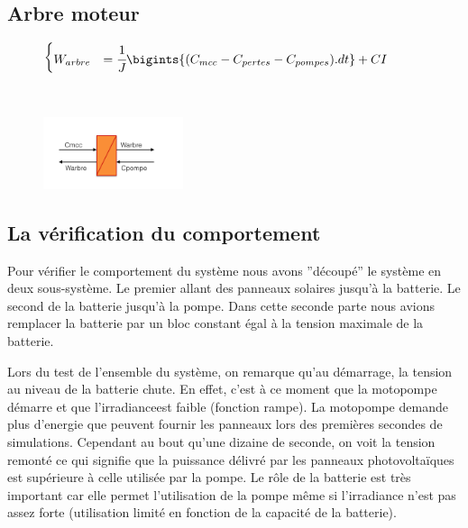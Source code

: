\subsection{Arbre moteur}
\vspace{-10px}
\begin{figure}[ht]
\centering
\begin{minipage}{.5\textwidth}  
\centering
$\begin{cases}
	 W_{arbre} &= \cfrac{1}{J}\bigints{(C_{mcc}-C_{pertes}-C_{pompes}).dt}+CI
\end{cases}$
\end{minipage}~
\begin{minipage}{.5\textwidth}
  \centering
\includegraphics[height=80px]{images/arbre.png}
\end{minipage}
\end{figure}
\FloatBarrier
\vspace{-20px}


\subsection{La vérification du comportement}

Pour vérifier le comportement du système nous avons ''découpé'' le système en deux sous-système. Le premier allant des panneaux solaires jusqu'à la batterie. Le second de la batterie jusqu'à la pompe. Dans cette seconde parte nous avions remplacer la batterie par un bloc constant égal à la tension maximale de la batterie. 


Lors du test de l'ensemble du système, on remarque qu'au démarrage, la tension au niveau de la batterie chute. En effet, c'est à ce moment que la motopompe démarre et que l'irradianceest faible (fonction rampe). La motopompe demande plus d'energie que peuvent fournir les panneaux lors des premières secondes de simulations. Cependant au bout qu'une dizaine de seconde, on voit la tension remonté ce qui signifie que la puissance délivré par les panneaux photovoltaïques est supérieure à celle utilisée par la pompe. Le rôle de la batterie est très important car elle permet l'utilisation de la pompe même si l'irradiance n'est pas assez forte (utilisation limité en fonction de la capacité de la batterie). 

